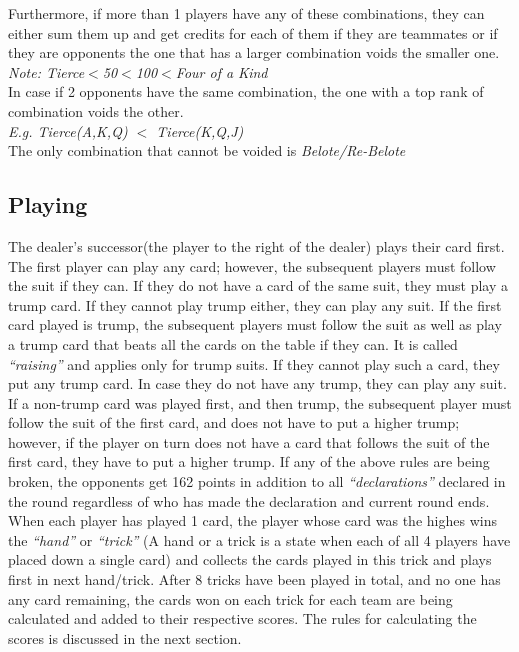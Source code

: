 Furthermore, if more than 1 players have any of these combinations, they can either sum them up and get credits for each of them if they are teammates or if they are opponents the one that has a larger combination voids the smaller one.\\
\textit{Note: Tierce$<$50$<$100$<$Four of a Kind}\\
In case if 2 opponents have the same combination, the one with a top rank of combination voids the other.\\
\textit{E.g. Tierce(A,K,Q) $<$ Tierce(K,Q,J)}\\
The only combination that cannot be voided is \textit{Belote/Re-Belote}

\subsection{Playing}
\hspace{\parindent} The dealer's successor(the player to the right of the dealer) plays their card first.
The first player can play any card; however, the subsequent players must follow the suit if they can.
If they do not have a card of the same suit, they must play a trump card.
If they cannot play trump either, they can play any suit.
If the first card played is trump, the subsequent players must follow the suit as well as play a trump card that beats all the cards on the table if they can.
It is called \textit{``raising''} and applies only for trump suits.
If they cannot play such a card, they put any trump card.
In case they do not have any trump, they can play any suit.
If a non-trump card was played first, and then trump, the subsequent player must follow the suit of the first card, and does not have to put a higher trump; however, if the player on turn does not have a card that follows the suit of the first card, they have to put a higher trump.
If any of the above rules are being broken, the opponents get 162 points in addition to all \textit{``declarations''} declared in the round regardless of who has made the declaration and current round ends.
When each player has played 1 card, the player whose card was the highes wins the \textit{``hand''} or \textit{``trick''} (A hand or a trick is a state when each of all 4 players have placed down a single card) and collects the cards played in this trick and plays first in next hand/trick.
After 8 tricks have been played in total, and no one has any card remaining, the cards won on each trick for each team are being calculated and added to their respective scores.
The rules for calculating the scores is discussed in the next section.
